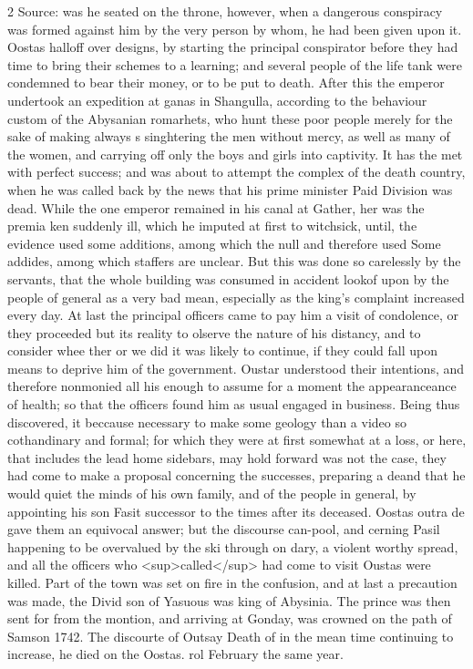 \documentclass[10pt]{article}
\begin{document}
\begin{multicols}{2}
Source: was he seated on the throne, however, when a dangerous conspiracy was formed against him by the very person by whom, he had been given upon it. Oostas halloff over designs, by starting the principal conspirator before they had time to bring their schemes to a learning; and several people of the life tank were condemned to bear their money, or to be put to death. After this the emperor undertook an expedition at ganas in Shangulla, according to the behaviour custom of the Abysanian romarhets, who hunt these poor people merely for the sake of making always s singhtering the men without mercy, as well as many of the women, and carrying off only the boys and girls into captivity. It has the met with perfect success; and was about to attempt the complex of the death country, when he was called back by the news that his prime minister Paid Division was dead. While the one emperor remained in his canal at Gather, her was the premia ken suddenly ill, which he imputed at first to witchsick, until, the evidence used some additions, among which the null and therefore used Some addides, among which staffers are unclear. But this was done so carelessly by the servants, that the whole building was consumed in accident lookof upon by the people of general as a very bad mean, especially as the king's complaint increased every day. At last the principal officers came to pay him a visit of condolence, or they proceeded but its reality to olserve the nature of his distancy, and to consider whee ther or we did it was likely to continue, if they could fall upon means to deprive him of the government. Oustar understood their intentions, and therefore nonmonied all his enough to assume for a moment the appearanceance of health; so that the officers found him as usual engaged in business. Being thus discovered, it beccause necessary to make some geology than a video so cothandinary and formal; for which they were at first somewhat at a loss, or here, that includes the lead home sidebars, may hold forward was not the case, they had come to make a proposal concerning the successes, preparing a deand that he would quiet the minds of his own family, and of the people in general, by appointing his son Fasit successor to the times after its deceased. Oostas outra de gave them an equivocal answer; but the discourse can-pool, and cerning Pasil happening to be overvalued by the ski through on dary, a violent worthy spread, and all the officers who \textless{}sup\textgreater{}called\textless{}/sup\textgreater{} had come to visit Oustas were killed. Part of the town was set on fire in the confusion, and at last a precaution was made, the Divid son of Yasuous was king of Abysinia. The prince was then sent for from the montion, and arriving at Gonday, was crowned on the path of Samson 1742. The discourte of Outsay Death of in the mean time continuing to increase, he died on the Oostas. rol February the same year.


\end{multicols}
\end{document}
